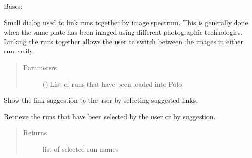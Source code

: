\documentclass[letterpaper,10pt,english]{sphinxmanual}
\begin{document}
\begin{fulllineitems}
\label{\detokenize{polo.windows:polo.windows.spectrum_dialog.SpectrumDialog}}
Bases: 

Small dialog used to link runs together by image spectrum. This is
generally done when the same plate has been imaged using different
photographic technologies. Linking the runs together allows the user to
switch between the images in either run easily.
\begin{quote}\begin{description}
\item[{Parameters}] \leavevmode
{} () \textendash{} List of runs that have been loaded into Polo

\end{description}\end{quote}

\begin{fulllineitems}
\label{\detokenize{polo.windows:polo.windows.spectrum_dialog.SpectrumDialog.display_suggestion}}
Show the link suggestion to the user by selecting suggested links.

\end{fulllineitems}


\begin{fulllineitems}
\label{\detokenize{polo.windows:polo.windows.spectrum_dialog.SpectrumDialog.get_selections}}
Retrieve the runs that have been selected by the user or by
suggestion.
\begin{quote}\begin{description}
\item[{Returns}] \leavevmode
list of selected run names


\end{description}
\end{quote}
\end{fulllineitems}
\end{fulllineitems}
\end{document}

